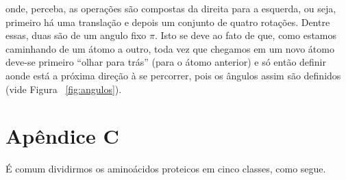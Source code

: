 \documentclass[a4paper,12pt]{article}
\begin{document}
 	onde, perceba, as operações são compostas da direita para a esquerda, ou seja, primeiro há uma translação e depois um conjunto de quatro rotações. Dentre essas, duas são de um angulo fixo $\pi$. Isto se deve ao fato de que, como estamos caminhando de um átomo a outro, toda vez que chegamos em um novo átomo deve-se primeiro ``olhar para trás'' (para o átomo anterior) e só então definir aonde está a próxima direção à se percorrer, pois os ângulos assim são definidos (vide Figura ~\ref{fig:angulos}).
 	
 	\newpage
 	\section*{Apêndice C} 
 	
 	É comum dividirmos os aminoácidos proteicos em cinco classes, como segue.
\end{document}
